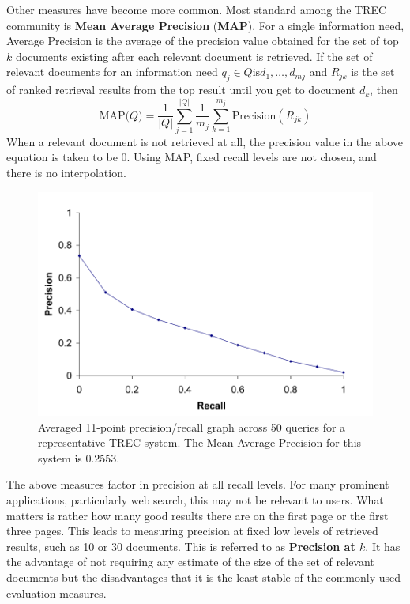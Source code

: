 \documentclass[letterpaper,11pt]{article}
\begin{document}
Other measures have become more common. Most standard among the TREC community is \textbf{Mean Average Precision} (\textbf{MAP}). For a single information need, Average Precision is the average of the precision value obtained for the set of top $k$ documents existing after each relevant document is retrieved. If the set of relevant documents for an information need $q_j \in Q \textrm{is} {d_1,\dots,d_{mj}}$ and $R_{jk}$ is the set of ranked retrieval results from the top result until you get to document $d_k$, then
\[
\textrm{MAP($Q$)} = \frac{1}{|Q|} \sum_{j = 1}^{|Q|}{\frac{1}{m_j}} \sum_{k = 1}^{m_j}{\textrm{Precision}(R_{jk})}
\]
When a relevant document is not retrieved at all, the precision value in the above equation is taken to be 0.
Using MAP, fixed recall levels are not chosen, and there is no interpolation. 
\begin{figure}[H]
    \centering
    \includegraphics[scale=0.55]{sect8/figure_8_3.png}
    \caption{Averaged 11-point precision/recall graph across 50 queries for a representative TREC system. The Mean Average Precision for this system is 0.2553.}
\end{figure}

The above measures factor in precision at all recall levels. For many prominent applications, particularly web search, this may not be relevant to users. What matters is rather how many good results there are on the first page or the first three pages. This leads to measuring precision at fixed low levels of retrieved results, such as 10 or 30 documents. This is referred to as \textbf{Precision at $k$}. It has the advantage of not requiring any estimate of the size of the set of relevant documents but the disadvantages that it is the least stable of the commonly used evaluation measures.
\end{document}
